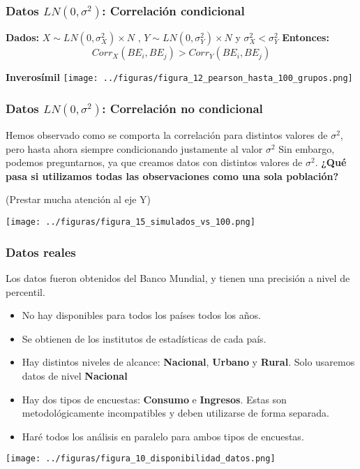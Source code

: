 \documentclass[10pt,mathserif]{beamer}%
\begin{document}
\begin{frame}
    \frametitle{Datos $LN(0, \sigma^2)$: Correlación condicional}
    \begin{conjeture}
    \textbf{Dados: } $X \sim LN(0,\sigma_X^2) \times N$ , $Y \sim LN(0,\sigma_Y^2) \times N$ y $\sigma_X^2 < \sigma_Y^2$
    \textbf{Entonces:} $$ Corr_X(BE_i,BE_j) > Corr_Y(BE_i,BE_j)$$
    \end{conjeture}
    \pause
    \textbf{Inverosímil}
    \texttt{[image: ../figuras/figura\_12\_pearson\_hasta\_100\_grupos.png]} %
\end{frame}

\begin{frame}
    \frametitle{Datos $LN(0, \sigma^2)$: Correlación no condicional}
    Hemos observado como se comporta la correlación para distintos valores de $\sigma^2$, pero hasta ahora siempre condicionando justamente al valor $\sigma^2$
    Sin embargo, podemos preguntarnos, ya que creamos datos con distintos valores de $\sigma^2$.
    \textbf{¿Qué pasa si utilizamos todas las observaciones como una sola población?}
    \pause

    (Prestar mucha atención al eje Y)
    
    \texttt{[image: ../figuras/figura\_15\_simulados\_vs\_100.png]} %

\end{frame}

\begin{frame}
    \frametitle{Datos reales}
    Los datos fueron obtenidos del Banco Mundial, y tienen una precisión a nivel de percentil.
    \begin{itemize}
        \item No hay disponibles para todos los países todos los años.
        \item Se obtienen de los institutos de estadísticas de cada país.
        \item Hay distintos niveles de alcance: \textbf{Nacional}, \textbf{Urbano} y \textbf{Rural}. Solo usaremos datos de nivel \textbf{Nacional}
        \item Hay dos tipos de encuestas: \textbf{Consumo} e \textbf{Ingresos}. Estas son metodológicamente incompatibles y deben utilizarse de forma separada.
        \item Haré todos los análisis en paralelo para ambos tipos de encuestas. 
    \end{itemize}
    \texttt{[image: ../figuras/figura\_10\_disponibilidad\_datos.png]} %
\end{frame}
\end{document}
